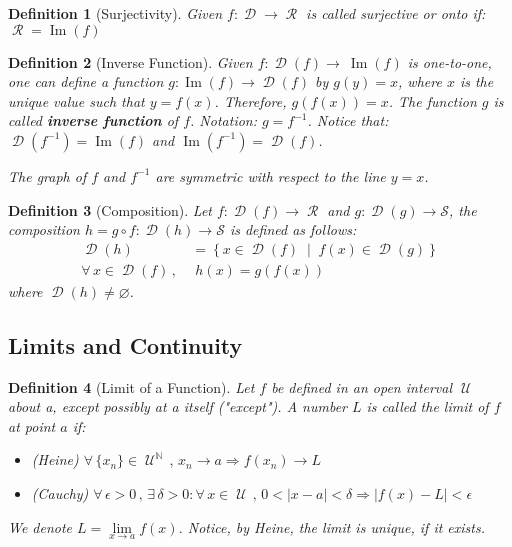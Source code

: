 \documentclass[12pt]{article}
\let\emptyset\varnothing
\let\RA\Rightarrow
\newcommand{\set}[2]{\left\{{#1}\;\middle|\;{#2}\right\}}
\newcommand{\Forall}[1]{\forall\,{#1}\,,\,}
\newcommand{\Exist}[1]{\exists\,{#1}:}
\DeclareMathOperator{\N}{\mathbb{N}}
\DeclareMathOperator{\D}{\mathcal{D}}
\DeclareMathOperator{\U}{\mathcal{U}}
\DeclareMathOperator{\Ran}{\mathcal{R}}
\DeclareMathOperator{\Image}{Im}
\newtheorem{definition}{Definition}[subsection]
\begin{document}
\begin{definition}[Surjectivity]
  Given $f:\D\to\Ran$ is called surjective or onto if: $\Ran=\Image(f)$
\end{definition}

\begin{definition}[Inverse Function]
  Given $f:\D(f)\to\ \Image(f)$ is one-to-one, one can define a function $g:\Image(f)\to\D(f)$ by $g(y)=x$, where $x$ is the unique value such that $y=f(x)$. Therefore, $g(f(x))=x$. The function $g$ is called \textbf{inverse function} of $f$. Notation: $g=f^{-1}$. Notice that: $\D(f^{-1})=\Image(f)$ and $\Image(f^{-1})=\D(f)$.

  The graph of $f$ and $f^{-1}$ are symmetric with respect to the line $y=x$.
\end{definition}

\begin{definition}[Composition]
  Let $f:\D(f)\to\Ran$ and $g:\D(g)\to\mathcal{S}$, the composition $h=g\circ f:\D(h)\to\mathcal{S}$ is defined as follows:
  \begin{align*}
    \D(h)&=\set{x\in\D(f)}{f(x)\in\D(g)}\\
    \Forall{x\in \D(f)}&\;h(x)=g(f(x))
  \end{align*}
  where $\D(h)\neq\emptyset$.
\end{definition}

\pagebreak

\subsection{Limits and Continuity}

\begin{definition}[Limit of a Function]
  Let $f$ be defined in an open interval $\U$ about a, except possibly at a itself ("except"). A number $L$ is called the limit of $f$ at point $a$ if:
  \begin{itemize}
    \item[](Heine) $\Forall{\{x_n\}\in \U^{\N}} x_n\to a \RA f(x_n)\to L$
    \item[](Cauchy) $\Forall{\epsilon>0}\Exist{\delta>0}\Forall{x\in\U}0<|x-a|<\delta\RA |f(x)-L|<\epsilon$
  \end{itemize}
  We denote $L=\lim\limits_{x\to a}f(x)$. Notice, by Heine, the limit is unique, if it exists.
\end{definition}
\end{document}
